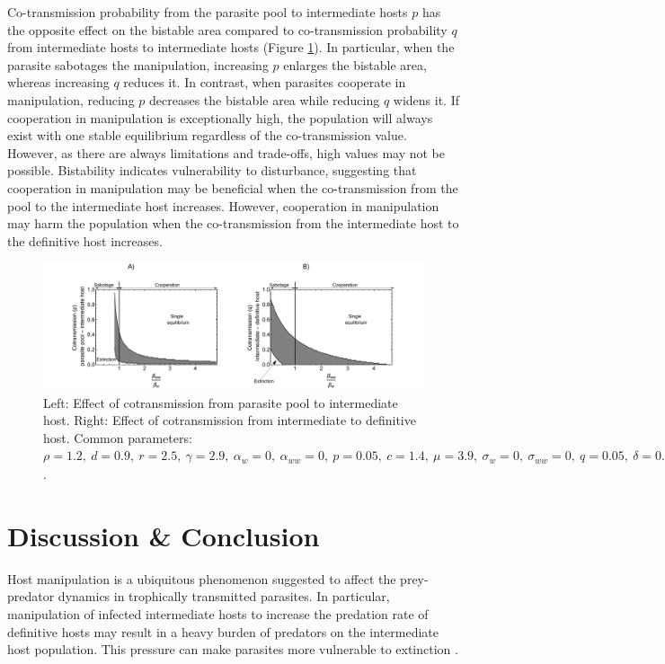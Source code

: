 \documentclass[a4paper]{scrartcl}
\begin{document}
Co-transmission probability from the parasite pool to intermediate hosts $p$ has the opposite effect on the bistable area compared to co-transmission probability $q$ from intermediate hosts to intermediate hosts (Figure \ref{fig:contransmission}). 
In particular, when the parasite sabotages the manipulation, increasing $p$ enlarges the bistable area, whereas increasing $q$ reduces it. 
In contrast, when parasites cooperate in manipulation, reducing $p$ decreases the bistable area while reducing $q$ widens it.  
If cooperation in manipulation is exceptionally high, the population will always exist with one stable equilibrium regardless of the co-transmission value.
However, as there are always limitations and trade-offs, high values may not be possible.
Bistability indicates vulnerability to disturbance, suggesting that cooperation in manipulation may be beneficial when the co-transmission from the pool to the intermediate host increases. 
However, cooperation in manipulation may harm the population when the co-transmission from the intermediate host to the definitive host increases.

\begin{figure}[!ht]
	\captionsetup{format=plain}
	\centering
	\includegraphics[width=\textwidth]{Figures/coinfect_transmission.pdf}
	\caption{Left: Effect of cotransmission from parasite pool to intermediate host. Right: Effect of cotransmission from intermediate to definitive host. Common parameters:  $\rho = 1.2, \ d = 0.9, \ r = 2.5, \ \gamma = 2.9, \ \alpha_w = 0, \ \alpha_{ww} = 0, \ p = 0.05, \ c = 1.4, \ \mu = 3.9, \ \sigma_w = 0, \ \sigma_{ww} = 0, \ q = 0.05, \ \delta = 0.9, \ k = 0.26, \ \epsilon = 4.5, \ \beta_w = 1.45, \ f_w = 38, \ h = 0.6$.}
	\label{fig:contransmission}
\end{figure}

\section*{Discussion \& Conclusion}
Host manipulation is a ubiquitous phenomenon suggested to affect the prey-predator dynamics in trophically transmitted parasites. 
In particular, manipulation of infected intermediate hosts to increase the predation rate of definitive hosts may result in a heavy burden of predators on the intermediate host population.
This pressure can make parasites more vulnerable to extinction \citep{Hadeler1989,Fenton2006}. 
\end{document}
